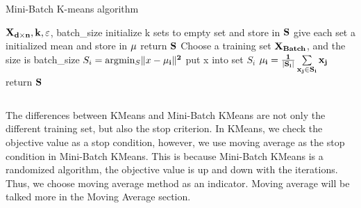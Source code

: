 \documentclass[final,leqno,onefignum,onetabnum]{siamltexmm}
\DeclarePairedDelimiter\abs{\lvert}{\rvert}%
\DeclarePairedDelimiter\norm{\lVert}{\rVert}%
\newcommand{\argmin}{\arg\!\min}
\begin{document}
\begin{algorithm}[H]
	\caption{Mini-Batch K-means algorithm}
	\label{pseudoMiniKmeans}
	\begin{algorithmic}[1]
		 {$\bf{X}_{d \times n}, k, \varepsilon$, batch\_size}
		\State initialize k sets to empty set and store in $\bf{S}$
		\State give each set a initialized mean and store in $\bf{\mu}$
		\State return $\bf{S}$
		\EndIf
		\State Choose a training set $\bf{X}_{Batch}$, and the size is batch\_size
		\State $S_i = \argmin_S \norm{x - \bf{\mu}_i}^2$
		\State put x into set $S_i$
		\EndFor
		\State $ \bf{\mu}_i = \frac{1}{\abs{S_i}}\sum \limits_{x_j \in S_i} x_j $
		\EndFor
		\EndFor 
		\State return $\bf{S}$
		\EndProcedure
	\end{algorithmic}
\end{algorithm}
\begin{verbatim}

\end{verbatim}
The differences between KMeans and Mini-Batch KMeans are not only the different training set, but also the stop criterion. In KMeans, we check the objective value as a stop condition, however, we use moving average as the stop condition in Mini-Batch KMeans. This is because Mini-Batch KMeans is a randomized algorithm, the objective value is up and down with the iterations. Thus, we choose moving average method as an indicator. Moving average will be talked more in the Moving Average section.
\end{document}

